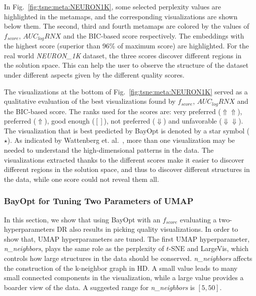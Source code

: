 In Fig.~\ref{fig:tsne:meta:NEURON1K}, some selected perplexity values are highlighted in the metamaps, and the corresponding visualizations are shown below them.
The second, third and fourth metamaps are colored by the values of $f_{score}$, $AUC_{log}RNX$ and the BIC-based score respectively.
The embeddings with the highest score (superior than 96\% of maximum score) are highlighted.
For the real world \emph{NEURON\_1K} dataset, the three scores discover different regions in the solution space. This can help the user to observe the structure of the dataset under different aspects given by the different quality scores.

The visualizations at the bottom of Fig.~\ref{fig:tsne:meta:NEURON1K} served as a qualitative evaluation of the best visualizations found by $f_{score}$, $AUC_{log}RNX$ and the BIC-based score.
The ranks used for the scores are: very preferred ($\Uparrow\Uparrow$), preferred ($\Uparrow$), good enough ($[]$), not preferred ($\Downarrow$) and unfavorable ($\Downarrow\Downarrow$).
The visualization that is best predicted by BayOpt is denoted by a star symbol ($\star$).
As indicated by Wattenberg et. al.~\cite{wattenberg2016use}, more than one visualization may be needed to understand the high-dimensional patterns in the data.
The visualizations extracted thanks to the different scores make it easier to discover different regions in the solution space, and thus to discover different structures in the data, while one score could not reveal them all.


\subsubsection{BayOpt for Tuning Two Parameters of UMAP}\label{sec:result:bo:umap}

In this section, we show that using BayOpt with an $f_{score}$ evaluating a two-hyperparameters DR also results in picking quality visualizations. In order to show that, UMAP hyperparameters are tuned. The first UMAP hyperparameter, \emph{n\_neighbors}, plays the same role as the perplexity of $t$-SNE and LargeVis, which controls how large structures in the data should be conserved.
\emph{n\_neighbors} affects the construction of the k-neighbor graph in HD.
A small value leads to many small connected components in the visualization, while a large value provides a boarder view of the data.
A suggested range for \emph{n\_neighbors} is $[5, 50]$.

